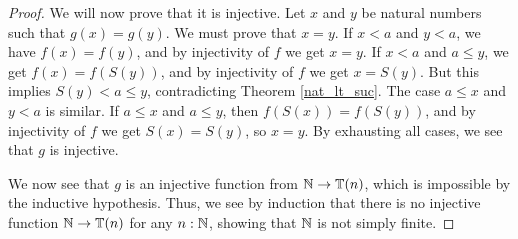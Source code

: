 \documentclass[../../math.tex]{subfiles}
\begin{document}
\begin{proof}
    We will now prove that it is injective.  Let $x$ and $y$ be natural numbers
    such that $g(x) = g(y)$.  We must prove that $x = y$.  If $x < a$ and $y <
    a$, we have $f(x) = f(y)$, and by injectivity of $f$ we get $x = y$.  If $x
    < a$ and $a \leq y$, we get $f(x) = f(S(y))$, and by injectivity of $f$ we
    get $x = S(y)$.  But this implies $S(y) < a \leq y$, contradicting Theorem
    \ref{nat_lt_suc}.  The case $a \leq x$ and $y < a$ is similar.  If $a \leq
    x$ and $a \leq y$, then $f(S(x)) = f(S(y))$, and by injectivity of $f$ we
    get $S(x) = S(y)$, so $x = y$.  By exhausting all cases, we see that $g$ is
    injective.

    We now see that $g$ is an injective function from $\mathbb{N} \to \mathbb{T}(n)$, which is
    impossible by the inductive hypothesis.  Thus, we see by induction that
    there is no injective function $\mathbb{N} \to \mathbb{T}(n)$ for any $n : \mathbb{N}$, showing that
    $\mathbb{N}$ is not simply finite.
\end{proof}
\end{document}
